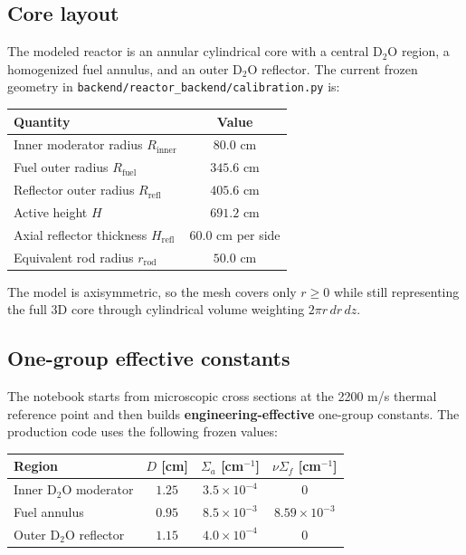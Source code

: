 \documentclass[11pt]{article}
\begin{document}
\subsection{Core layout}

The modeled reactor is an annular cylindrical core with a central D$_2$O region,
a homogenized fuel annulus, and an outer D$_2$O reflector.  The current frozen
geometry in \texttt{backend/reactor\_backend/}\linebreak\texttt{calibration.py}
is:

\begin{center}
\begin{tabular}{lc}
\toprule
Quantity & Value \\
\midrule
Inner moderator radius $R_{\mathrm{inner}}$ & $80.0$ cm \\
Fuel outer radius $R_{\mathrm{fuel}}$ & $345.6$ cm \\
Reflector outer radius $R_{\mathrm{refl}}$ & $405.6$ cm \\
Active height $H$ & $691.2$ cm \\
Axial reflector thickness $H_{\mathrm{refl}}$ & $60.0$ cm per side \\
Equivalent rod radius $r_{\mathrm{rod}}$ & $50.0$ cm \\
\bottomrule
\end{tabular}
\end{center}

The model is axisymmetric, so the mesh covers only $r \ge 0$ while still
representing the full 3D core through cylindrical volume weighting
$2\pi r\,dr\,dz$.

\subsection{One-group effective constants}

The notebook starts from microscopic cross sections at the 2200 m/s thermal
reference point and then builds \textbf{engineering-effective} one-group
constants.  The production code uses the following frozen values:

\begin{center}
\begin{tabular}{lccc}
\toprule
Region & $D$ [cm] & $\Sigma_a$ [cm$^{-1}$] & $\nu\Sigma_f$ [cm$^{-1}$] \\
\midrule
Inner D$_2$O moderator & $1.25$ & $3.5\times 10^{-4}$ & $0$ \\
Fuel annulus & $0.95$ & $8.5\times 10^{-3}$ & $8.59\times 10^{-3}$ \\
Outer D$_2$O reflector & $1.15$ & $4.0\times 10^{-4}$ & $0$ \\
\bottomrule
\end{tabular}
\end{center}
\end{document}
